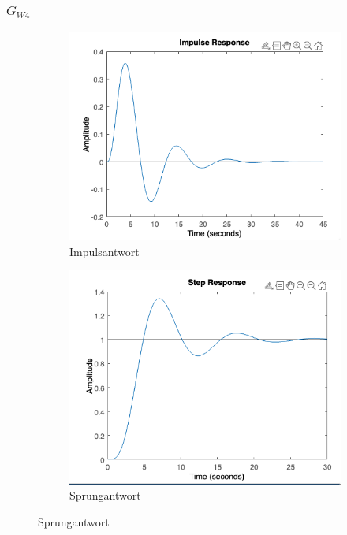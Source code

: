 \documentclass{article}
\begin{document}
 				\subsubsection{$G_{W4}$}
 					\begin{figure}[h]
 						\begin{subfigure}{0.5\textwidth}
 							\includegraphics[width=1.2\linewidth]{./Impulsantwort_GW4.png}
						    \caption{Impulsantwort}
						    \label{fig:subimg4_1}
					    \end{subfigure}
					    \begin{subfigure}{0.5\textwidth}
					    		\includegraphics[width=1.2\linewidth]{./Sprungantwort_GW4.png}
					    		\caption{Sprungantwort}
					    		\label{fig:subimg4_2}
					    \end{subfigure}
 					\end{figure}
\end{document}
